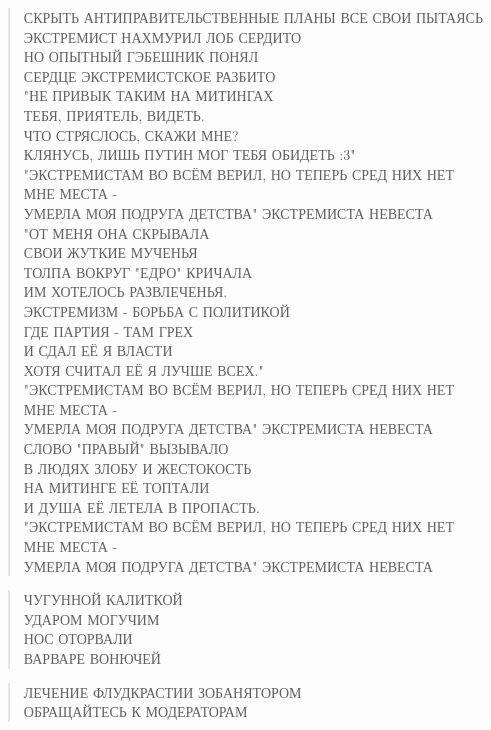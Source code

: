 \poemtitle{***}
\begin{verse}
СКРЫТЬ АНТИПРАВИТЕЛЬСТВЕННЫЕ ПЛАНЫ ВСЕ СВОИ ПЫТАЯСЬ\\
ЭКСТРЕМИСТ НАХМУРИЛ ЛОБ СЕРДИТО\\
НО ОПЫТНЫЙ ГЭБЕШНИК ПОНЯЛ\\
СЕРДЦЕ ЭКСТРЕМИСТСКОЕ РАЗБИТО\\
"НЕ ПРИВЫК ТАКИМ НА МИТИНГАХ\\
ТЕБЯ, ПРИЯТЕЛЬ, ВИДЕТЬ.\\
ЧТО СТРЯСЛОСЬ, СКАЖИ МНЕ?\\
КЛЯНУСЬ, ЛИШЬ ПУТИН МОГ ТЕБЯ ОБИДЕТЬ :3"\\
"ЭКСТРЕМИСТАМ ВО ВСЁМ ВЕРИЛ, НО ТЕПЕРЬ СРЕД НИХ НЕТ МНЕ МЕСТА -\\
УМЕРЛА МОЯ ПОДРУГА ДЕТСТВА" ЭКСТРЕМИСТА НЕВЕСТА\\
"ОТ МЕНЯ ОНА СКРЫВАЛА\\
СВОИ ЖУТКИЕ МУЧЕНЬЯ\\
ТОЛПА ВОКРУГ "ЕДРО" КРИЧАЛА\\
ИМ ХОТЕЛОСЬ РАЗВЛЕЧЕНЬЯ.\\
ЭКСТРЕМИЗМ - БОРЬБА С ПОЛИТИКОЙ\\
ГДЕ ПАРТИЯ - ТАМ ГРЕХ\\
И СДАЛ ЕЁ Я ВЛАСТИ\\
ХОТЯ СЧИТАЛ ЕЁ Я ЛУЧШЕ ВСЕХ."\\
"ЭКСТРЕМИСТАМ ВО ВСЁМ ВЕРИЛ, НО ТЕПЕРЬ СРЕД НИХ НЕТ МНЕ МЕСТА -\\
УМЕРЛА МОЯ ПОДРУГА ДЕТСТВА" ЭКСТРЕМИСТА НЕВЕСТА\\
СЛОВО "ПРАВЫЙ" ВЫЗЫВАЛО\\
В ЛЮДЯХ ЗЛОБУ И ЖЕСТОКОСТЬ\\
НА МИТИНГЕ ЕЁ ТОПТАЛИ\\
И ДУША ЕЁ ЛЕТЕЛА В ПРОПАСТЬ.\\
"ЭКСТРЕМИСТАМ ВО ВСЁМ ВЕРИЛ, НО ТЕПЕРЬ СРЕД НИХ НЕТ МНЕ МЕСТА -\\
УМЕРЛА МОЯ ПОДРУГА ДЕТСТВА" ЭКСТРЕМИСТА НЕВЕСТА
\end{verse}

\poemtitle{***}
\begin{verse}
ЧУГУННОЙ КАЛИТКОЙ\\
УДАРОМ МОГУЧИМ\\
НОС ОТОРВАЛИ\\
ВАРВАРЕ ВОНЮЧЕЙ
\end{verse}

\poemtitle{***}
\begin{verse}
ЛЕЧЕНИЕ ФЛУДКРАСТИИ ЗОБАНЯТОРОМ\\
ОБРАЩАЙТЕСЬ К МОДЕРАТОРАМ
\end{verse}

